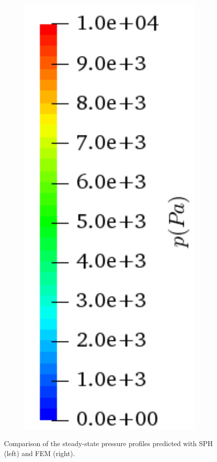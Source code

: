 \begin{figure}[H]
\begin{subfigure}{0.15\columnwidth}
		\includegraphics[width=1.0\textwidth]{images/FSI_Comparison/CD_p.png}
	\end{subfigure}
	\caption{Comparison of the steady-state pressure profiles predicted with  SPH (left) and FEM (right).}    \label{fig:CD}
\end{figure} 


